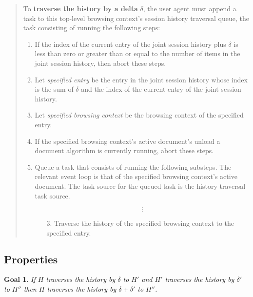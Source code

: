 \documentclass{notes}
\newtheorem{goal}{Goal}
\begin{document}
\begin{quote}
  To \textbf{traverse the history by a delta} $\delta$, the user agent
  must append a task to this top-level browsing context's session
  history traversal queue, the task consisting of running the
  following steps:
  \begin{enumerate}
    
  \item If the index of the current entry of the joint session history
    plus $\delta$ is less than zero or greater than or equal to the
    number of items in the joint session history, then abort these
    steps.

  \item Let \emph{specified entry} be the entry in the joint session
    history whose index is the sum of $\delta$ and the index of the
    current entry of the joint session history.

  \item Let \emph{specified browsing context} be the browsing context
    of the specified entry.

  \item If the specified browsing context's active document's unload a
    document algorithm is currently running, abort these steps.

  \item Queue a task that consists of running the following
    substeps. The relevant event loop is that of the specified
    browsing context's active document. The task source for the queued
    task is the history traversal task source.

    \[\vdots\]

    \begin{itemize}

    \item[3.] Traverse the history of the specified browsing context
      to the specified entry.

    \end{itemize}
  \end{enumerate}
\end{quote}

\subsection{Properties}
\label{sec:properties}

\begin{goal}
\label{goal:homomorphism}
  If $H$ traverses the history by $\delta$ to $H'$
  and $H'$ traverses the history by $\delta'$ to $H''$
  then $H$ traverses the history by $\delta+\delta'$ to $H''$.
\end{goal}
\end{document}
